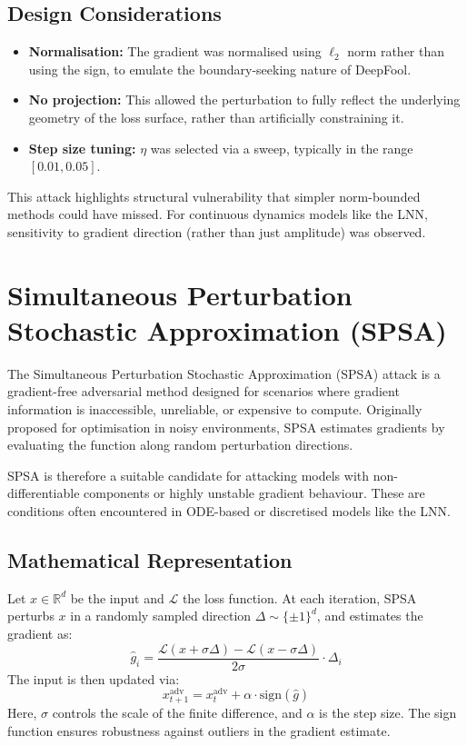 \subsection*{Design Considerations}
\begin{itemize}
    \item \textbf{Normalisation:} The gradient was normalised using $\ell_2$ norm rather than using the sign, to emulate the boundary-seeking nature of DeepFool.
    \item \textbf{No projection:} This allowed the perturbation to fully reflect the underlying geometry of the loss surface, rather than artificially constraining it.
    \item \textbf{Step size tuning:} $\eta$ was selected via a sweep, typically in the range $[0.01, 0.05]$.
\end{itemize}

This attack highlights structural vulnerability that simpler norm-bounded methods could have missed. For continuous dynamics models like the LNN, sensitivity to gradient direction (rather than just amplitude) was observed.

\section{Simultaneous Perturbation Stochastic Approximation (SPSA)}

The Simultaneous Perturbation Stochastic Approximation (SPSA) attack is a gradient-free adversarial method designed for scenarios where gradient information is inaccessible, unreliable, or expensive to compute. Originally proposed for optimisation in noisy environments, SPSA estimates gradients by evaluating the function along random perturbation directions.

SPSA is therefore a suitable candidate for attacking models with non-differentiable components or highly unstable gradient behaviour. These are conditions often encountered in ODE-based or discretised models like the LNN.

\subsection*{Mathematical Representation}
Let $x \in \mathbb{R}^d$ be the input and $\mathcal{L}$ the loss function. At each iteration, SPSA perturbs $x$ in a randomly sampled direction $\Delta \sim \{\pm 1\}^d$, and estimates the gradient as:
\[
\hat{g}_i = \frac{\mathcal{L}(x + \sigma \Delta) - \mathcal{L}(x - \sigma \Delta)}{2 \sigma} \cdot \Delta_i
\]
The input is then updated via:
\[
x^{\text{adv}}_{t+1} = x^{\text{adv}}_t + \alpha \cdot \text{sign}(\hat{g})
\]
Here, $\sigma$ controls the scale of the finite difference, and $\alpha$ is the step size. The sign function ensures robustness against outliers in the gradient estimate.

